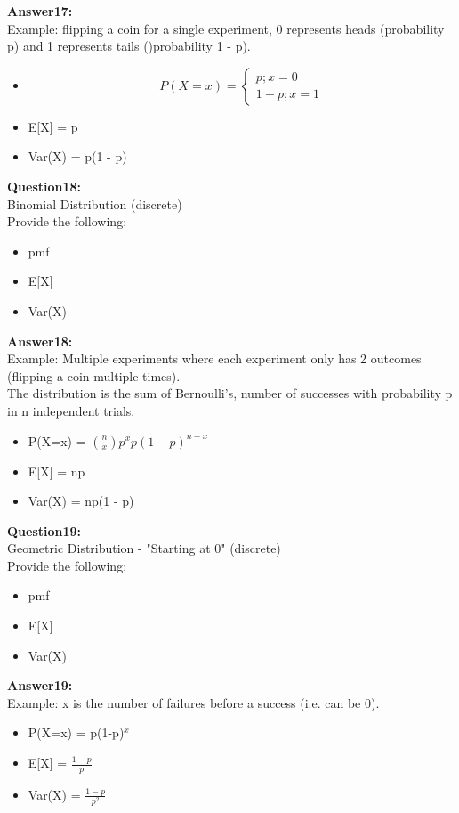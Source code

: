 \documentclass{article}
\begin{document}
\textbf{Answer17:} \\
Example: flipping a coin for a single experiment, 0 represents heads (probability p) and 1 represents tails ()probability 1 - p).
\begin{itemize}
	\item \[P(X=x) =
		\begin{cases} 
			p; x = 0 \\
			1 - p; x = 1   
		\end{cases}
	\]
	\item E[X] = p
	\item Var(X) = p(1 - p)
\end{itemize}


\textbf{Question18:} \\
Binomial Distribution (discrete)\\
Provide the following:
\begin{itemize}
	\item pmf
	\item E[X]
	\item Var(X)
\end{itemize}

\textbf{Answer18:} \\
Example: Multiple experiments where each experiment only has 2 outcomes (flipping a coin multiple times).\\
The distribution is the sum of Bernoulli's, number of successes with probability p in n independent trials.
\begin{itemize}
	\item P(X=x) = $\binom{n}{x}p^{x}p(1-p)^{n-x}$
	\item E[X] = np
	\item Var(X) = np(1 - p)
\end{itemize}


\textbf{Question19:} \\
Geometric Distribution - "Starting at 0" (discrete)\\
Provide the following:
\begin{itemize}
	\item pmf
	\item E[X]
	\item Var(X)
\end{itemize}

\textbf{Answer19:} \\
Example: x is the number of failures before a success (i.e. can be 0).
\begin{itemize}
	\item P(X=x) = p(1-p)$^x$
	\item E[X] = $\frac{1 - p}{p}$
	\item Var(X) = $\frac{1 - p}{p^2}$
\end{itemize}
\end{document}
